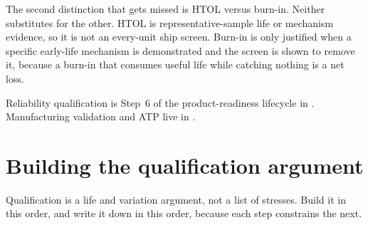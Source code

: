 The second distinction that gets missed is
HTOL versus
burn-in. Neither substitutes for the other.
HTOL is representative-sample life or mechanism evidence, so it is not an
every-unit ship screen. Burn-in is only justified when a specific early-life
mechanism is demonstrated and the screen is shown to remove it, because a
burn-in that consumes useful life while catching nothing is a net loss.

Reliability qualification is Step~6 of the product-readiness lifecycle in
. Manufacturing validation and
ATP live in .

\section{Building the qualification argument}
\label{sec:qual-argument}

Qualification is a life and variation argument, not a list of stresses. Build
it in this order, and write it down in this order, because each step constrains
the next.

